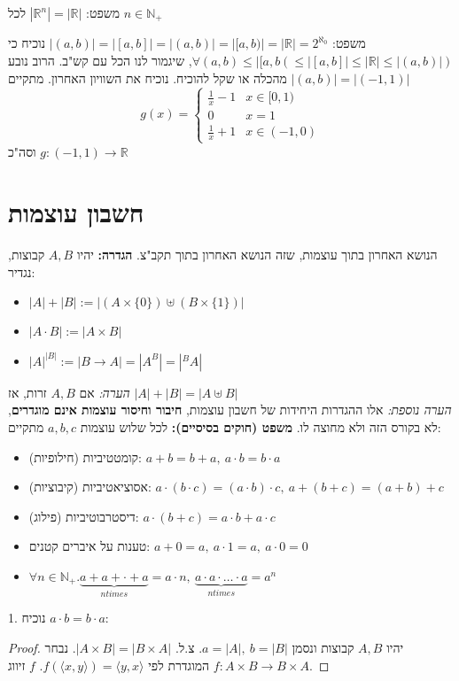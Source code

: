 \documentclass[]{article}
\newcommand\N     {\mathbb{N}}
\newcommand\R     {\mathbb{R}}
\newcommand\ra    {\rangle}
\newcommand\la    {\langle}
\newcommand\taz   {2^{\aleph_0}}
\begin{document}
	משפט: $ |\R^n| = |\R| $ לכל $ n \in \N_+ $
	
	משפט: 
	$ |(a, b)| = |[a, b]| = |(a, b)| = |[a, b)| = |\R| = \taz $
	נוכיח כי $ \forall (a, b) \le |[a, b( \le |[a, b]| \le |\R| \le |(a, b)|) $, שיגמור לנו הכל עם קש"ב. הרוב נובע מהכלה או שקל להוכיח. נוכיח את השוויון האחרון. מתקיים $ |(a, b)| = |(-1, 1)| $
	\[ g(x) = \begin{cases}
		\tfrac{1}{x} - 1 &x \in [0, 1) \\
		0 & x = 1 \\
		\tfrac{1}{x} + 1 &x \in (-1, 0)
	\end{cases} \]
	וסה"כ $ g \colon (-1, 1) \to \R $
	\section*{חשבון עוצמות}
	הנושא האחרון בתוך עוצמות, שזה הנושא האחרון בתוך תקב"צ. 
	\textbf{הגדרה: }יהיו $ A, B $ קבוצות, נגדיר: 
	\begin{itemize}
		\item $ |A| + |B| := |(A \times \{0\}) \uplus (B \times \{1\})| $
		\item $ |A \cdot B| := |A \times B| $
		\item $ |A|^{|B|} := |B \to A| = |A^B| = |^BA|$
	\end{itemize}
	\textit{הערה: }אם $ A, B $ זרות, אז $ |A| + |B| = |A \uplus B| $ \\
	\textit{הערה נוספת: }אלו ההגדרות היחידות של חשבון עוצמות, \textbf{חיבור וחיסור עוצמות אינם מוגדרים}, לא בקורס הזה ולא מחוצה לו. 
	\textbf{משפט (חוקים בסיסיים): }לכל שלוש עוצמות $ a, b, c $ מתקיים: 
	\begin{itemize}
		\item קומטטיביות (חילופיות): $ a + b = b + a, \ a \cdot b = b \cdot a $
		\item אסוציאטיביות (קיבוציות): $ a \cdot (b  \cdot c) = (a \cdot b) \cdot c, \ a + (b + c) = (a + b) + c $
		\item דיסטרבוטיביות (פילוג): $ a \cdot (b + c) = a \cdot b + a \cdot c $
		\item טענות על איברים קטנים: $ a + 0 = a, \ a \cdot 1 = a, \ a \cdot 0 = 0 $
		\item $ \forall n \in \N_+. \underbrace{a + a + \cdot + a}_{n times} = a \cdot n, \ \underbrace{a \cdot a \cdot \dots \cdot a}_{n times} = a^n $
	\end{itemize}
	1. נוכיח $ a \cdot b = b \cdot a $: 
	\begin{proof}
		יהיו $ A, B $ קבוצות ונסמן $ a = |A|, \ b = |B| $. צ.ל. $ |A \times B| = |B \times A| $. נבחר $ f \colon A \times B \to B \times A $ המוגדרת לפי $ f(\la x, y \ra) = \la y, x \ra $. $ f $ זיווג. 
	\end{proof}
\end{document}
